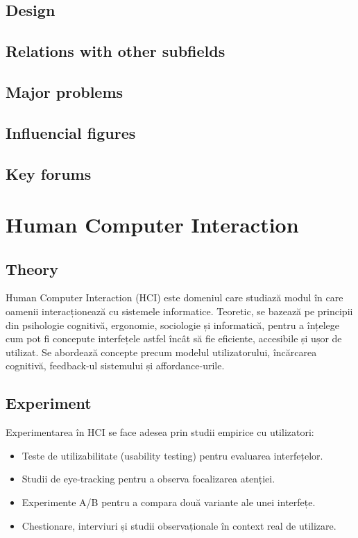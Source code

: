 \documentclass[12pt, letterpaper]{article}
\begin{document}
\subsection*{Design}

\subsection*{Relations with other subfields}

\subsection*{Major problems}

\subsection*{Influencial figures}

\subsection*{Key forums}

\newpage

\section{Human Computer Interaction}

\subsection*{Theory}
Human Computer Interaction (HCI) este domeniul care studiază modul în care oamenii interacționează cu sistemele informatice. Teoretic, se bazează pe principii din psihologie cognitivă, ergonomie, sociologie și informatică, pentru a înțelege cum pot fi concepute interfețele astfel încât să fie eficiente, accesibile și ușor de utilizat. Se abordează concepte precum modelul utilizatorului, încărcarea cognitivă, feedback-ul sistemului și affordance-urile.

\subsection*{Experiment}
Experimentarea în HCI se face adesea prin studii empirice cu utilizatori:
\begin{itemize}
    \item Teste de utilizabilitate (usability testing) pentru evaluarea interfețelor.
    \item Studii de eye-tracking pentru a observa focalizarea atenției.
    \item Experimente A/B pentru a compara două variante ale unei interfețe.
    \item Chestionare, interviuri și studii observaționale în context real de utilizare.
\end{itemize}
\end{document}
